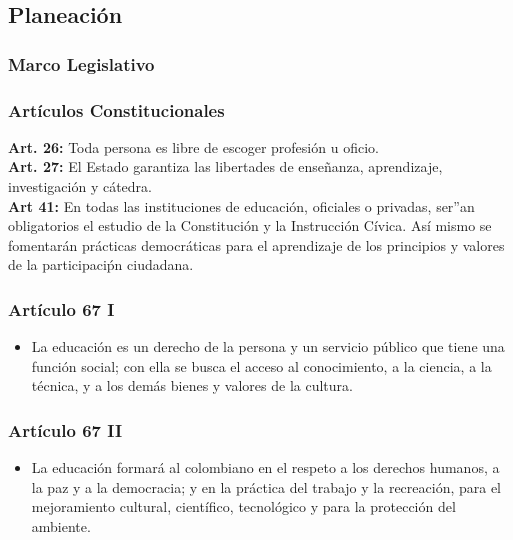 \documentclass{beamer}
\begin{document}
\subsection{Planeaci\'on}
\begin{frame}
\frametitle{Marco Legislativo}
\end{frame}
\begin{frame}
\frametitle{Art\'iculos Constitucionales}
\textbf{Art. 26: }Toda persona es libre de escoger profesión u oficio.  \\
\textbf{Art. 27: }El Estado garantiza las libertades de ense\~nanza, aprendizaje, investigación y c\'atedra. \\
\textbf{Art 41:} En todas las instituciones de educaci\'on, oficiales o privadas, ser''an obligatorios el estudio de la Constituci\'on y la Instrucci\'on C\'ivica. As\'i mismo se fomentar\'an pr\'acticas democr\'aticas para el aprendizaje de los principios y valores de la participaci\'pn ciudadana. 
\end{frame}

\begin{frame}
\frametitle{Art\'iculo 67 I}
\begin{itemize}
\item La educaci\'on es un derecho de la persona y un servicio p\'ublico que tiene una funci\'on social; con ella se busca el acceso al conocimiento, a la ciencia, a la t\'ecnica, y a los dem\'as bienes y valores de la cultura.
\end{itemize}

\end{frame}

\begin{frame}
\frametitle{Art\'iculo 67 II}
\begin{itemize}
\item La educaci\'on formar\'a  al colombiano en el respeto a los derechos humanos, a la paz y a la democracia; y en la pr\'actica del trabajo y la recreaci\'on, para el mejoramiento cultural, cient\'ifico, tecnol\'ogico y para la protecci\'on del ambiente.
\end{itemize}
\end{frame}
\end{document}
